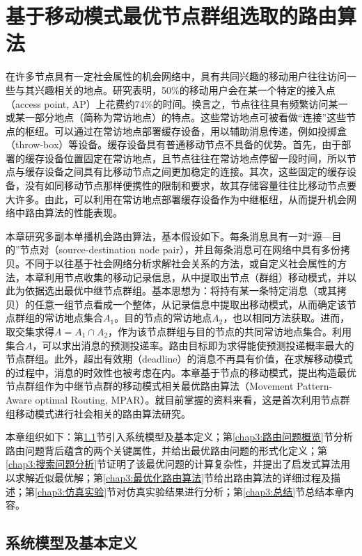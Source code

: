 \chapter{基于移动模式最优节点群组选取的路由算法}

在许多节点具有一定社会属性的机会网络中，具有共同兴趣的移动用户往往访问一些与其兴趣相关的地点。研究表明，50\%的移动用户会在某一个特定的接入点（access point, AP）上花费约74\%的时间\cite{Henderson:2004ul}。换言之，节点往往具有频繁访问某一或某一部分地点（简称为常访地点）的特点。这些常访地点可被看做``连接''这些节点的枢纽。可以通过在常访地点部署缓存设备，用以辅助消息传递，例如投掷盒（throw-box）\cite{Ibrahim:2009we}等设备。缓存设备具有普通移动节点不具备的优势。首先，由于部署的缓存设备位置固定在常访地点，且节点往往在常访地点停留一段时间，所以节点与缓存设备之间具有比移动节点之间更加稳定的连接。其次，这些固定的缓存设备，没有如同移动节点那样便携性的限制和要求，故其存储容量往往比移动节点要大许多。由此，可以利用在常访地点部署缓存设备作为中继枢纽，从而提升机会网络中路由算法的性能表现。

本章研究多副本单播机会路由算法，基本假设如下。每条消息具有一对“源—目的”节点对（source-destination node pair），并且每条消息可在网络中具有多份拷贝。不同于以往基于社会网络分析求解社会关系的方法，或自定义社会属性的方法，本章利用节点收集的移动记录信息，从中提取出节点（群组）移动模式，并以此为依据选出最优中继节点群组。基本思想为：将持有某一条特定消息（或其拷贝）的任意一组节点看成一个整体，从记录信息中提取出移动模式，从而确定该节点群组的常访地点集合$A_1$。目的节点的常访地点$A_2$，也以相同方法获取。进而，取交集求得$A=A_1\cap A_2$，作为该节点群组与目的节点的共同常访地点集合。利用集合$A$，可以求出消息的预测投递率。路由目标即为求得能使预测投递概率最大的节点群组。此外，超出有效期（deadline）的消息不再具有价值，在求解移动模式的过程中，消息的时效性也被考虑在内。本章基于节点的移动模式，提出构造最优节点群组作为中继节点群的移动模式相关最优路由算法（Movement Pattern-Aware optimal Routing, MPAR）。就目前掌握的资料来看，这是首次利用节点群组移动模式进行社会相关的路由算法研究。

本章组织如下：第\ref{chap3:系统模型及基本定义}节引入系统模型及基本定义；第\ref{chap3:路由问题概览}节分析路由问题背后蕴含的两个关键属性，并给出最优路由问题的形式化定义；第\ref{chap3:搜索问题分析}节证明了该最优问题的计算复杂性，并提出了启发式算法用以求解近似最优解；第\ref{chap3:最优化路由算法}节给出路由算法的详细过程及描述；第\ref{chap3:仿真实验}节对仿真实验结果进行分析；第\ref{chap3:总结}节总结本章内容。

\section{系统模型及基本定义}
\label{chap3:系统模型及基本定义}

